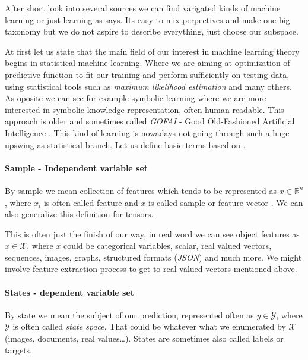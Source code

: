 After short look into several sources we can find varigated kinds of machine learning or just learning as \cite{Russell2009} says. Its easy to mix perpectives and make one big taxonomy but we do not aspire to describe everything, just choose our subspace.

At first let us state that the main field of our interest in machine learning theory begins in statistical machine learning. Where we are aiming at optimization of predictive function to fit our training and perform sufficiently on testing data, using statistical tools such as \emph{maximum likelihood estimation} and many others. As oposite we can see for example symbolic learning where we are more interested in symbolic knowledge representation, often human-readable. This approach is older and sometimes called \emph{GOFAI} - Good Old-Fashioned Artificial Intelligence \cite{Haugeland1985}. This kind of learning is nowadays not going through such a huge upswing as statistical branch. Let us define basic terms based on \cite{Franc2020}.


\paragraph{Sample - Independent variable set}
By sample we mean collection of features which tends to be represented as $x\in\mathbb{R}^{n}$, where $x_i$ is often called feature and $x$ is called sample or feature vector \cite{GoodBengCour16}. We can also generalize this definition for tensors.

This is often just the finish of our way, in real word we can see object features as $x \in \mathcal{X}$, where $x$ could be categorical variables, scalar, real valued vectors, sequences, images, graphs, structured formats (\emph{JSON}) and much more. We might involve feature extraction process to get to real-valued vectors mentioned above.

\paragraph{States - dependent variable set}
By state we mean the subject of our prediction, represented often as $y \in \mathcal{Y}$, where $\mathcal{Y}$ is often called \emph{state space}. That could be whatever what we enumerated by $\mathcal{X}$ (images, documents, real values\dots). States are sometimes also called labels or targets. 

